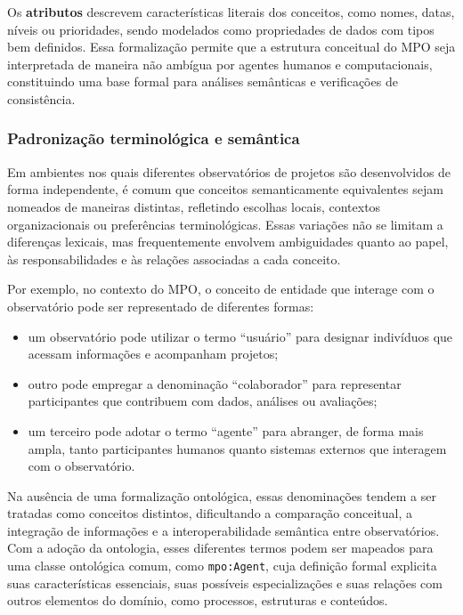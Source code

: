 Os \textbf{atributos} descrevem características literais dos conceitos, como nomes, datas, níveis ou prioridades, sendo modelados como propriedades de dados com tipos bem definidos. Essa formalização permite que a estrutura conceitual do MPO seja interpretada de maneira não ambígua por agentes humanos e computacionais, constituindo uma base formal para análises semânticas e verificações de consistência.

\subsubsection{Padronização terminológica e semântica}
Em ambientes nos quais diferentes observatórios de projetos são desenvolvidos de forma independente, é comum que conceitos semanticamente equivalentes sejam nomeados de maneiras distintas, refletindo escolhas locais, contextos organizacionais ou preferências terminológicas. Essas variações não se limitam a diferenças lexicais, mas frequentemente envolvem ambiguidades quanto ao papel, às responsabilidades e às relações associadas a cada conceito.

Por exemplo, no contexto do MPO, o conceito de entidade que interage com o observatório pode ser representado de diferentes formas:

\begin{itemize}
    \item um observatório pode utilizar o termo “usuário” para designar indivíduos que acessam informações e acompanham projetos;
    \item outro pode empregar a denominação “colaborador” para representar participantes que contribuem com dados, análises ou avaliações;
    \item um terceiro pode adotar o termo “agente” para abranger, de forma mais ampla, tanto participantes humanos quanto sistemas externos que interagem com o observatório.
\end{itemize}

Na ausência de uma formalização ontológica, essas denominações tendem a ser tratadas como conceitos distintos, dificultando a comparação conceitual, a integração de informações e a interoperabilidade semântica entre observatórios. Com a adoção da ontologia, esses diferentes termos podem ser mapeados para uma classe ontológica comum, como \texttt{mpo:Agent}, cuja definição formal explicita suas características essenciais, suas possíveis especializações e suas relações com outros elementos do domínio, como processos, estruturas e conteúdos.

